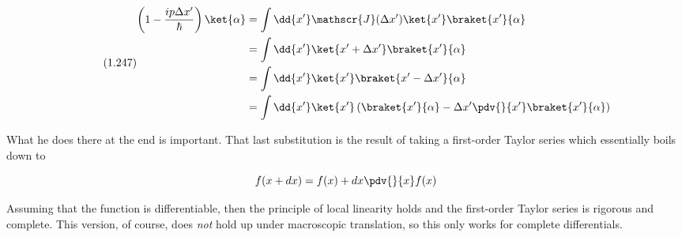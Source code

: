     \begin{equation}
      \tag{1.247}
      \begin{split}
        \left(1 - \frac{ip\Delta x'}{\hbar}\right)\ket{\alpha}
        &=
        \int \dd{x'}
        \mathscr{J}(\Delta x')\ket{x'}\braket{x'}{\alpha}
        \\
        &=
        \int \dd{x'}
        \ket{x' + \Delta x'}\braket{x'}{\alpha}
        \\
        &=
        \int \dd{x'}
        \ket{x'}\braket{x' -  \Delta x'}{\alpha}
        \\
        &=
        \int \dd{x'}
        \ket{x'}
        \left(
        \braket{x'}{\alpha} - \Delta x' \pdv{}{x'}\braket{x'}{\alpha}
        \right)
        \\
      \end{split}
    \end{equation}

    What he does there at the end is important.  That last
    substitution is the result of taking a first-order Taylor series
    which essentially boils down to

    \begin{equation}
      f(x + dx) = f(x) + dx\pdv{}{x}f(x)
    \end{equation}

    Assuming that the function is differentiable, then the principle
    of local linearity holds and the first-order Taylor series is
    rigorous and complete.  This version, of course, does \emph{not}
    hold up under macroscopic translation, so this only works for
    complete differentials.
